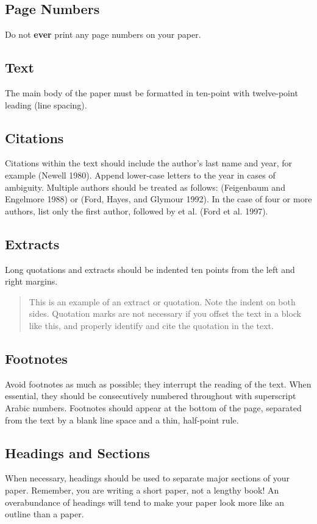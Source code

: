 \documentclass[letterpaper]{article}
\begin{document}
\subsection{Page Numbers}

Do not \textbf{ever} print any page numbers on your paper. 

\subsection{Text }
The main body of the paper must be formatted in ten-point with twelve-point leading (line spacing).

\subsection{Citations}
Citations within the text should include the author's last name and year, for example (Newell 1980). Append lower-case letters to the year in cases of ambiguity. Multiple authors should be treated as follows: (Feigenbaum and Engelmore 1988) or (Ford, Hayes, and Glymour 1992). In the case of four or more authors, list only the first author, followed by et al. (Ford et al. 1997).

\subsection{Extracts}
Long quotations and extracts should be indented ten points from the left and right margins. 

\begin{quote}
This is an example of an extract or quotation. Note the indent on both sides. Quotation marks are not necessary if you offset the text in a block like this, and properly identify and cite the quotation in the text. 

\end{quote}

\subsection{Footnotes}
Avoid footnotes as much as possible; they interrupt the reading of the text. When essential, they should be consecutively numbered throughout with superscript Arabic numbers. Footnotes should appear at the bottom of the page, separated from the text by a blank line space and a thin, half-point rule. 

\subsection{Headings and Sections}
When necessary, headings should be used to separate major sections of your paper. Remember, you are writing a short paper, not a lengthy book! An overabundance of headings will tend to make your paper look more like an outline than a paper.
\end{document}

